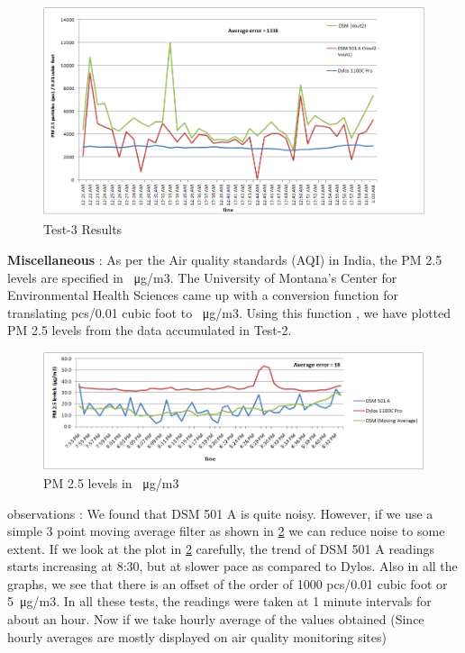 \documentclass[a4paper,12pt]{article}
\begin{document}
\begin{figure}[!ht]
	\centering
	\includegraphics[scale=0.5]{dsm_test_3.png}
	\caption{Test-3 Results}
	\label{fig:test3}
\end{figure}

\textbf{Miscellaneous} : As per the Air quality standards (AQI) in India, the PM 2.5 levels are specified in \SI{}{\micro\gram}/m3. The University of Montana's Center for Environmental Health Sciences came up with a conversion function for translating pcs/0.01 cubic foot to \SI{}{\micro\gram}/m3. Using this function \cite{dylos}, we have plotted PM 2.5 levels from the data accumulated in Test-2. 
\begin{figure}[!ht]
	\centering
	\includegraphics[scale=0.5]{dsm_test_4.png}
	\caption{PM 2.5 levels in \SI{}{\micro\gram}/m3}
	\label{fig:test4}
\end{figure}
\newline observations : We found that DSM 501 A is quite noisy. However, if we use a simple 3 point moving average filter as shown in \ref{fig:test4} we can reduce noise to some extent. If we look at the plot in \ref{fig:test4} carefully, the trend of DSM 501 A readings starts increasing at 8:30, but at slower pace as compared to Dylos. Also in all the graphs, we see that there is an offset of the order of 1000 pcs/0.01 cubic foot or 5\SI{}{\micro\gram}/m3. 
\newline In all these tests, the readings were taken at 1 minute intervals for about an hour. Now if we take hourly average of the values obtained (Since hourly averages are mostly displayed on air quality monitoring sites)
\end{document}
